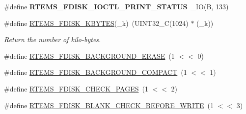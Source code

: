 \begin{DoxyCompactItemize}
\mbox{\label{group__RTEMSFDisk_gab389f3a22fcfe84cb92842c328dcefcc}} 
\#define {\bfseries R\+T\+E\+M\+S\+\_\+\+F\+D\+I\+S\+K\+\_\+\+I\+O\+C\+T\+L\+\_\+\+P\+R\+I\+N\+T\+\_\+\+S\+T\+A\+T\+US}~\+\_\+\+IO(\textquotesingle{}B\textquotesingle{}, 133)
\item 
\mbox{\label{group__RTEMSFDisk_ga907c65153df83bedad2668cbe3d8d120}} 
\#define \mbox{\hyperlink{group__RTEMSFDisk_ga907c65153df83bedad2668cbe3d8d120}{R\+T\+E\+M\+S\+\_\+\+F\+D\+I\+S\+K\+\_\+\+K\+B\+Y\+T\+ES}}(\+\_\+k)~(U\+I\+N\+T32\+\_\+C(1024) $\ast$ (\+\_\+k))
\begin{DoxyCompactList}\small\item\em Return the number of kilo-\/bytes. \end{DoxyCompactList}\item 
\#define \mbox{\hyperlink{group__RTEMSFDisk_ga73e85fdb0656e7ab09e8a63d48d8becf}{R\+T\+E\+M\+S\+\_\+\+F\+D\+I\+S\+K\+\_\+\+B\+A\+C\+K\+G\+R\+O\+U\+N\+D\+\_\+\+E\+R\+A\+SE}}~(1 $<$$<$ 0)
\item 
\#define \mbox{\hyperlink{group__RTEMSFDisk_ga6a5bec45cf7f7ada226478f09256bd1c}{R\+T\+E\+M\+S\+\_\+\+F\+D\+I\+S\+K\+\_\+\+B\+A\+C\+K\+G\+R\+O\+U\+N\+D\+\_\+\+C\+O\+M\+P\+A\+CT}}~(1 $<$$<$ 1)
\item 
\#define \mbox{\hyperlink{group__RTEMSFDisk_ga4d81d60c676b7ad742f0a51b193c15b8}{R\+T\+E\+M\+S\+\_\+\+F\+D\+I\+S\+K\+\_\+\+C\+H\+E\+C\+K\+\_\+\+P\+A\+G\+ES}}~(1 $<$$<$ 2)
\item 
\#define \mbox{\hyperlink{group__RTEMSFDisk_ga47c3c0239203378502183004b56be45e}{R\+T\+E\+M\+S\+\_\+\+F\+D\+I\+S\+K\+\_\+\+B\+L\+A\+N\+K\+\_\+\+C\+H\+E\+C\+K\+\_\+\+B\+E\+F\+O\+R\+E\+\_\+\+W\+R\+I\+TE}}~(1 $<$$<$ 3)
\end{DoxyCompactItemize}
